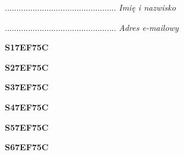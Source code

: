 \begin{turn}{90}\begin{minipage}{\linewidth} \vspace{20mm} ................................................  \textit{Imię i nazwisko}\end{minipage}\end{turn}

\begin{turn}{90}\begin{minipage}{\linewidth} \vspace{20mm} ................................................  \textit{Adres e-mailowy}\end{minipage}\end{turn}

\begin{turn}{90}\huge \begin{minipage}{\linewidth} \vspace{10mm}\textbf{S17EF75C}\end{minipage}\end{turn}

\begin{turn}{90}\huge \begin{minipage}{\linewidth} \vspace{10mm}\textbf{S27EF75C}\end{minipage}\end{turn}

\begin{turn}{90}\huge \begin{minipage}{\linewidth} \vspace{10mm}\textbf{S37EF75C}\end{minipage}\end{turn}

\begin{turn}{90}\huge \begin{minipage}{\linewidth} \vspace{10mm}\textbf{S47EF75C}\end{minipage}\end{turn}

\begin{turn}{90}\huge \begin{minipage}{\linewidth} \vspace{10mm}\textbf{S57EF75C}\end{minipage}\end{turn}

\begin{turn}{90}\huge \begin{minipage}{\linewidth} \vspace{10mm}\textbf{S67EF75C}\end{minipage}\end{turn}

